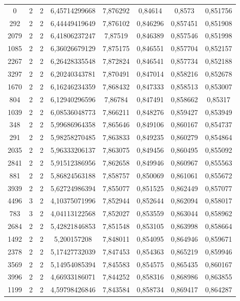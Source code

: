 \begin{longtable}{|c|c|c|c|c|c|c|c|}
0 & 2 & 2 & 6,45714299668 & 7,876292 & 0,84614 & 0,8573 & 0,851756 \\
292 & 2 & 2 & 6,44449419649 & 7,876102 & 0,846296 & 0,857451 & 0,851908 \\
2079 & 2 & 2 & 6,41806237247 & 7,87519 & 0,846389 & 0,857546 & 0,851998 \\
1085 & 2 & 2 & 6,36026679129 & 7,875175 & 0,846551 & 0,857704 & 0,852157 \\
2267 & 2 & 2 & 6,26428335548 & 7,872824 & 0,846541 & 0,857734 & 0,852188 \\
3297 & 2 & 2 & 6,20240343781 & 7,870491 & 0,847014 & 0,858216 & 0,852678 \\
1670 & 2 & 2 & 6,16246234359 & 7,868432 & 0,847333 & 0,858513 & 0,853007 \\
804 & 2 & 2 & 6,12940296596 & 7,86784 & 0,847491 & 0,858662 & 0,85317 \\
1039 & 2 & 2 & 6,08536048773 & 7,866211 & 0,848276 & 0,859427 & 0,853949 \\
348 & 2 & 2 & 5,99686964358 & 7,865646 & 0,849106 & 0,860167 & 0,854737 \\
291 & 2 & 2 & 5,98258270485 & 7,863833 & 0,849235 & 0,860279 & 0,854864 \\
2035 & 2 & 2 & 5,96333206137 & 7,863075 & 0,849456 & 0,860495 & 0,855092 \\
2841 & 2 & 2 & 5,91512386956 & 7,862658 & 0,849946 & 0,860967 & 0,855563 \\
881 & 2 & 2 & 5,86824563188 & 7,858757 & 0,850069 & 0,861061 & 0,855672 \\
3939 & 2 & 2 & 5,62724986394 & 7,855077 & 0,851525 & 0,862449 & 0,857077 \\
4496 & 3 & 2 & 4,10375071996 & 7,852944 & 0,852644 & 0,862094 & 0,858017 \\
783 & 3 & 2 & 4,04113122568 & 7,852027 & 0,853559 & 0,863044 & 0,858962 \\
2684 & 2 & 2 & 5,42821846853 & 7,851548 & 0,853105 & 0,863998 & 0,858664 \\
1492 & 2 & 2 & 5,200157208 & 7,848011 & 0,854095 & 0,864946 & 0,859671 \\
2378 & 2 & 2 & 5,17427732039 & 7,847453 & 0,854363 & 0,865219 & 0,859946 \\
3569 & 2 & 2 & 5,14954085394 & 7,845583 & 0,854575 & 0,865435 & 0,860167 \\
3996 & 2 & 2 & 4,66933186071 & 7,844252 & 0,858316 & 0,868986 & 0,863855 \\
1199 & 2 & 2 & 4,59798426846 & 7,843584 & 0,858734 & 0,869417 & 0,864287 \\

\end{longtable}
